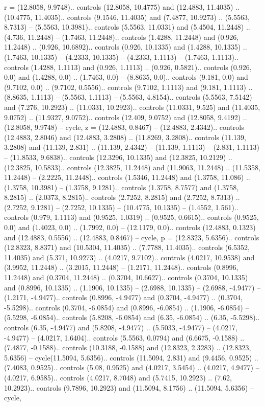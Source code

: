 {r} = {(12.8058, 9.9748).. controls (12.8058, 10.4775) and (12.4883, 11.4035) .. (10.4775, 11.4035).. controls (9.1546, 11.4035) and (7.4877, 10.9273) .. (5.5563, 8.7313) -- (5.5563, 10.3981).. controls (5.5563, 11.0331) and (5.4504, 11.2448) .. (4.736, 11.2448) -- (1.7463, 11.2448).. controls (1.4288, 11.2448) and (0.926, 11.2448) .. (0.926, 10.6892).. controls (0.926, 10.1335) and (1.4288, 10.1335) .. (1.7463, 10.1335) -- (4.2333, 10.1335) -- (4.2333, 1.1113) -- (1.7463, 1.1113).. controls (1.4288, 1.1113) and (0.926, 1.1113) .. (0.926, 0.5821).. controls (0.926, 0.0) and (1.4288, 0.0) .. (1.7463, 0.0) -- (8.8635, 0.0).. controls (9.181, 0.0) and (9.7102, 0.0) .. (9.7102, 0.5556).. controls (9.7102, 1.1113) and (9.181, 1.1113) .. (8.8635, 1.1113) -- (5.5563, 1.1113) -- (5.5563, 4.8154).. controls (5.5563, 7.5142) and (7.276, 10.2923) .. (11.0331, 10.2923).. controls (11.0331, 9.525) and (11.4035, 9.0752) .. (11.9327, 9.0752).. controls (12.409, 9.0752) and (12.8058, 9.4192) .. (12.8058, 9.9748) -- cycle},
{z} = {(12.4883, 0.8467) -- (12.4883, 2.4342).. controls (12.4883, 2.8046) and (12.4883, 3.2808) .. (11.8269, 3.2808).. controls (11.139, 3.2808) and (11.139, 2.831) .. (11.139, 2.4342) -- (11.139, 1.1113) -- (2.831, 1.1113) -- (11.8533, 9.6838).. controls (12.3296, 10.1335) and (12.3825, 10.2129) .. (12.3825, 10.5833).. controls (12.3825, 11.2448) and (11.9063, 11.2448) .. (11.5358, 11.2448) -- (2.2225, 11.2448).. controls (1.5346, 11.2448) and (1.3758, 11.086) .. (1.3758, 10.3981) -- (1.3758, 9.1281).. controls (1.3758, 8.7577) and (1.3758, 8.2815) .. (2.0373, 8.2815).. controls (2.7252, 8.2815) and (2.7252, 8.7313) .. (2.7252, 9.1281) -- (2.7252, 10.1335) -- (10.4775, 10.1335) -- (1.4552, 1.561).. controls (0.979, 1.1113) and (0.9525, 1.0319) .. (0.9525, 0.6615).. controls (0.9525, 0.0) and (1.4023, 0.0) .. (1.7992, 0.0) -- (12.1179, 0.0).. controls (12.4883, 0.1323) and (12.4883, 0.5556) .. (12.4883, 0.8467) -- cycle},
{p} = {(12.8323, 5.6356).. controls (12.8323, 8.8371) and (10.5304, 11.4035) .. (7.7788, 11.4035).. controls (6.5352, 11.4035) and (5.371, 10.9273) .. (4.0217, 9.7102).. controls (4.0217, 10.9538) and (3.9952, 11.2448) .. (3.2015, 11.2448) -- (1.2171, 11.2448).. controls (0.8996, 11.2448) and (0.3704, 11.2448) .. (0.3704, 10.6627).. controls (0.3704, 10.1335) and (0.8996, 10.1335) .. (1.1906, 10.1335) -- (2.6988, 10.1335) -- (2.6988, -4.9477) -- (1.2171, -4.9477).. controls (0.8996, -4.9477) and (0.3704, -4.9477) .. (0.3704, -5.5298).. controls (0.3704, -6.0854) and (0.8996, -6.0854) .. (1.1906, -6.0854) -- (5.5298, -6.0854).. controls (5.8208, -6.0854) and (6.35, -6.0854) .. (6.35, -5.5298).. controls (6.35, -4.9477) and (5.8208, -4.9477) .. (5.5033, -4.9477) -- (4.0217, -4.9477) -- (4.0217, 1.6404).. controls (5.5563, 0.0794) and (6.6675, -0.1588) .. (7.4877, -0.1588).. controls (10.3188, -0.1588) and (12.8323, 2.3283) .. (12.8323, 5.6356) -- cycle(11.5094, 5.6356).. controls (11.5094, 2.831) and (9.4456, 0.9525) .. (7.4083, 0.9525).. controls (5.08, 0.9525) and (4.0217, 3.5454) .. (4.0217, 4.9477) -- (4.0217, 6.9585).. controls (4.0217, 8.7048) and (5.7415, 10.2923) .. (7.62, 10.2923).. controls (9.7896, 10.2923) and (11.5094, 8.1756) .. (11.5094, 5.6356) -- cycle},

